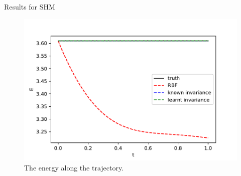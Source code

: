 \documentclass{beamer}
\begin{document}
\begin{frame}{Results for SHM}
{\begin{figure}[H] 
  \includegraphics[width=0.8\linewidth]{../codes/figures/shm_energy.pdf}
  \centering
  \caption{The energy along the trajectory.}\end{figure}
}
\end{frame}
\end{document}
